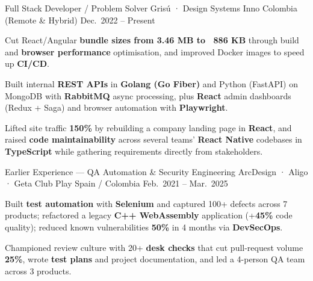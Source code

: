 \begin{cventries}
  \cventry
  {Full Stack Developer / Problem Solver}
  {Grisú · Design Systems Inno}
  {Colombia (Remote \& Hybrid)}
  {Dec.\ 2022 -- Present}
  {
    \begin{cvitems}
      \item {Cut React/Angular \textbf{bundle sizes from 3.46 MB to ~886 KB} through build and \textbf{browser performance} optimisation, and improved Docker images to speed up \textbf{CI/CD}.}
      \item {Built internal \textbf{REST APIs} in \textbf{Golang (Go Fiber)} and Python (FastAPI) on MongoDB with \textbf{RabbitMQ} async processing, plus \textbf{React} admin dashboards (Redux + Saga) and browser automation with \textbf{Playwright}.}
      \item {Lifted site traffic \textbf{150\%} by rebuilding a company landing page in \textbf{React}, and raised \textbf{code maintainability} across several teams' \textbf{React Native} codebases in \textbf{TypeScript} while gathering requirements directly from stakeholders.}
    \end{cvitems}
  }

  \cventry
  {Earlier Experience --- QA Automation \& Security Engineering}
  {ArcDesign · Aligo · Geta Club Play}
  {Spain / Colombia}
  {Feb.\ 2021 -- Mar.\ 2025}
  {
    \begin{cvitems}
      \item {Built \textbf{test automation} with \textbf{Selenium} and captured 100+ defects across 7 products; refactored a legacy \textbf{C++ WebAssembly} application (+\textbf{45\%} code quality); reduced known vulnerabilities \textbf{50\%} in 4 months via \textbf{DevSecOps}.}
      \item {Championed review culture with 20+ \textbf{desk checks} that cut pull-request volume \textbf{25\%}, wrote \textbf{test plans} and project documentation, and led a 4-person QA team across 3 products.}
    \end{cvitems}
  }

\end{cventries}
